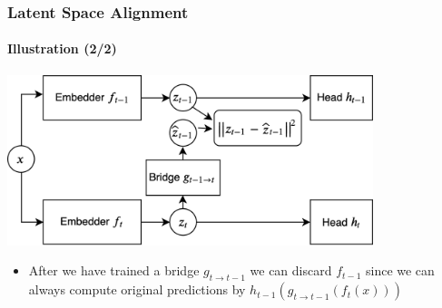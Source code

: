 \documentclass[10pt]{beamer}
\begin{document}
\begin{frame}
    \frametitle{Latent Space Alignment}
    \framesubtitle{Illustration (2/2)}
    
    \centering
    \includegraphics[width=0.8\textwidth]{images/latent-space-alignment.png}
    
    \begin{itemize}
        \item After we have trained a bridge $g_{t \to t-1}$ we can discard $f_{t-1}$ since we can always compute original predictions by $h_{t-1}(g_{t \to t-1}(f_t(x)))$
    \end{itemize}
\end{frame}
\end{document}
